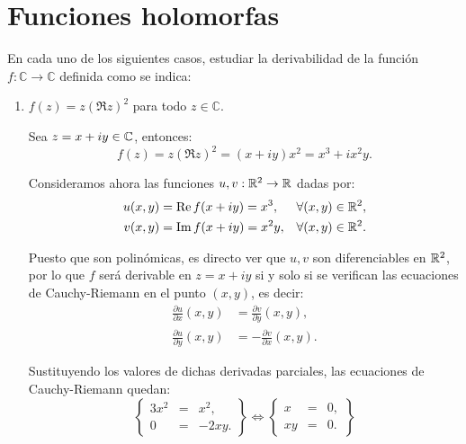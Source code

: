\section{Funciones holomorfas}

\begin{ejercicio}
    En cada uno de los siguientes casos, estudiar la derivabilidad de la función $f : \mathbb{C} \to \mathbb{C}$ definida como se indica:
    \begin{enumerate}
        \item $f(z) = z(\Re z)^2$ para todo $z \in \mathbb{C}$.
        
        Sea $z = x + iy\in \mathbb{C}$, entonces:
        \[
            f(z) = z(\Re z)^2 = (x + iy)x^2 = x^3 + ix^2y.
        \]

        Consideramos ahora las funciones $u,v:\mathbb{R}^2\to\mathbb{R}$ dadas por:
        \begin{align*}
            u(x,y) &= \operatorname{Re} f(x+iy) = x^3,&\forall (x,y)\in\mathbb{R}^2,\\
            v(x,y) &= \operatorname{Im} f(x+iy) = x^2y,&\forall (x,y)\in\mathbb{R}^2.
        \end{align*}

        Puesto que son polinómicas, es directo ver que $u,v$ son diferenciables en $\mathbb{R}^2$, por lo que $f$ será derivable en $z=x+iy$ si y solo si se verifican las ecuaciones de Cauchy-Riemann en el punto $(x,y)$, es decir:
        \begin{align*}
            \frac{\partial u}{\partial x}(x,y) &= \frac{\partial v}{\partial y}(x,y),\\
            \frac{\partial u}{\partial y}(x,y) &= -\frac{\partial v}{\partial x}(x,y).
        \end{align*}

        Sustituyendo los valores de dichas derivadas parciales, las ecuaciones de Cauchy-Riemann quedan:
        \begin{equation*}
            \left\{
                \begin{array}{rcl}
                    3x^2 &=& x^2,\\
                    0 &=& -2xy.
                \end{array}
            \right\}
            \iff
            \left\{
                \begin{array}{rcl}
                    x &=& 0,\\
                    xy &=& 0.
                \end{array}
            \right\}
        \end{equation*}


\end{enumerate}
\end{ejercicio}
